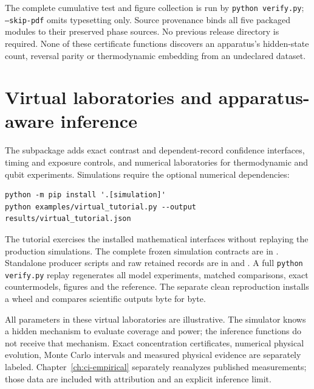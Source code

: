 The complete cumulative test and figure collection is run by
\texttt{python verify.py}; \texttt{--skip-pdf} omits typesetting only.
Source provenance binds all five packaged modules to their preserved phase
sources. No previous release directory is required. None of these certificate
functions discovers an apparatus's hidden-state count, reversal parity or
thermodynamic embedding from an undeclared dataset.


\section{Virtual laboratories and apparatus-aware inference}
The  subpackage adds exact contrast and
dependent-record confidence interfaces, timing and exposure controls, and
numerical laboratories for thermodynamic and qubit experiments. Simulations
require the optional numerical dependencies:
\begin{verbatim}
python -m pip install '.[simulation]'
python examples/virtual_tutorial.py --output results/virtual_tutorial.json
\end{verbatim}
The tutorial exercises the installed mathematical interfaces without replaying
the production simulations. The complete frozen simulation contracts are in
. Standalone producer scripts and raw retained records
are in  and . A full
\texttt{python verify.py} replay regenerates all model experiments, matched
comparisons, exact countermodels, figures and the reference. The separate clean
reproduction installs a wheel and compares scientific outputs byte for byte.

All parameters in these virtual laboratories are illustrative. The simulator knows a hidden
mechanism to evaluate coverage and power; the inference functions do not receive
that mechanism. Exact concentration certificates, numerical physical evolution,
Monte Carlo intervals and measured physical evidence are separately labeled.
Chapter~\ref{ch:ci-empirical} separately reanalyzes published measurements;
those data are included with attribution and an explicit inference limit.

